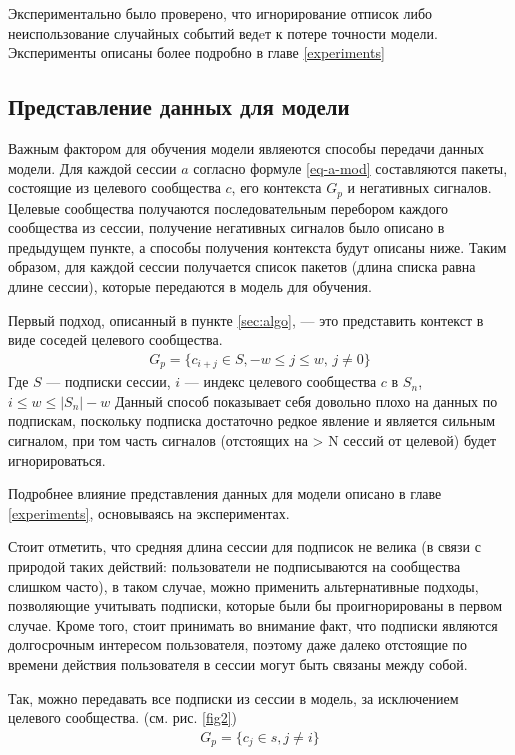 \documentclass[times,specification,annotation]{itmo-student-thesis}
\begin{document}
Экспериментально было проверено, что игнорирование отписок либо неиспользование случайных событий ведeт к потере точности модели. Эксперименты описаны более подробно в главе \ref{experiments}

\subsection{Представление данных для модели}\label{sec:dataf}

Важным фактором для обучения модели являеются способы передачи данных модели. Для каждой сессии $a$ согласно формуле \ref{eq-a-mod} составляются пакеты, состоящие из целевого сообщества $c$, его контекста $G_p$ и негативных сигналов. Целевые сообщества получаются последовательным перебором каждого сообщества из сессии, получение негативных сигналов было описано в предыдущем пункте, а способы получения контекста будут описаны ниже. Таким образом, для каждой сессии получается список пакетов (длина списка равна длине сессии), которые передаются в модель для обучения.

Первый подход, описанный в пункте \ref{sec:algo}, --- это представить контекст в виде соседей целевого сообщества. 
\begin{align}
G_p =\{c_{i + j} \in S, -w \leq j \leq w,\, j \ne 0\} \label{eq4}
\end{align}
Где $S$ --- подписки сессии, $i$ --- индекс целевого сообщества $c$ в $S_n$, $i \leq w \leq |S_n| - w$
Данный способ показывает себя довольно плохо на данных по подпискам, поскольку подписка
достаточно редкое явление и является сильным сигналом, при том часть сигналов
(отстоящих на > N сессий от целевой) будет игнорироваться.

Подробнее влияние представления данных для модели описано в главе  \ref{experiments}, основываясь на экспериментах.

Стоит отметить, что средняя длина сессии для подписок не велика (в связи с природой таких действий: пользователи не подписываются на сообщества слишком часто), в таком случае, можно применить альтернативные подходы, позволяющие учитывать подписки, которые были бы проигнорированы в первом случае. Кроме того, стоит принимать во внимание факт, что подписки являются долгосрочным интересом пользователя, поэтому даже далеко отстоящие по времени действия пользователя в сессии могут быть связаны между собой.

Так, можно передавать все подписки из сессии в модель, за исключением целевого сообщества. (см. рис. \ref{fig2})
\begin{align}
G_p =\{c_j \in s, j \ne i\} \label{eq5}
\end{align}
\end{document}
